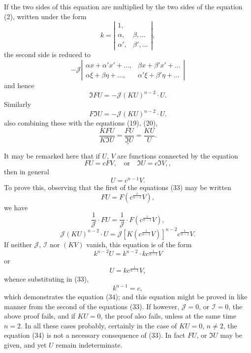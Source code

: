 \documentclass[11pt,a4paper]{book}
\begin{document}
\newpage
If the two sides of this equation are multiplied by the two sides of the equation
(2), written under the form
\[
k = \left|\begin{array}{cc}
1, & \\
\alpha, & \beta, \ldots \\
\alpha', & \beta', \ldots
\end{array}\right|
\tag{27},
\]
the second side is reduced to
\[
-\mathcal{J}
\left|\begin{array}{cc}
\alpha x + \alpha'x' + \ldots, & \beta x + \beta'x' + \ldots \\
\alpha\xi + \beta\eta + \ldots, & \alpha'\xi + \beta'\eta + \ldots
\end{array}\right|
\]
and hence
\[
\mathfrak{I}FU = -\mathcal{J}(KU)^{n-2}\cdot U
\tag{28}.
\]
Similarly
\[
F\mathfrak{I}U = -\mathcal{J}(KU)^{n-2}\cdot U
\tag{29}.
\]
also combining these with the equations (19), (20),
\[
\frac{KFU}{K\mathfrak{I}U} = \frac{FU}{\mathfrak{I}U} = \frac{KU}{U}
\tag{30}.
\]
\[
\tag{31}.
\]
\[
\tag{32}.
\]

It may be remarked here that if $U$, $V$ are functions connected by the equation
\[
FU = cFV, \quad \text{or} \quad \mathfrak{I}U = c\mathfrak{I}V, \tag{33},
\]
then in general
\[
U = c^{n-1}V \tag{34}.
\]
To prove this, observing that the first of the equations (33) may be written
\[
FU = F(c^{\frac{1}{n-1}}V) \tag{35},
\]
we have
\[
\frac{1}{\mathcal{J}} \cdot FU = \frac{1}{\mathcal{J}} \cdot F(c^{\frac{1}{n-1}}V) \tag{36},
\]
\[
\mathcal{J}(KU)^{n-2}\cdot U = \mathcal{J}[K(c^{\frac{1}{n-1}}V)]^{n-2} c^{\frac{1}{n-1}}V \tag{37}.
\]
If neither $\mathcal{J}$, $\mathcal{I}$ nor $(KV)$ vanish, this equation is of the form
\[
k^{n-2}U = k^{n-2}\cdot kc^{\frac{1}{n-1}}V
\]
or
\[
U = kc^{\frac{1}{n-1}}V \tag{38},
\]
whence substituting in (33),
\[
k^{n-1} = c \tag{39},
\]
which demonstrates the equation (34); and this equation might be proved in like
manner from the second of the equations (33). If however, $\mathcal{J} = 0$, or $\mathcal{I} = 0$, the above
proof fails, and if $KU = 0$, the proof also fails, unless at the same time $n = 2$. In all
these cases probably, certainly in the case of $KU = 0$, $n \neq 2$, the equation (34) is not
a necessary consequence of (33). In fact $FU$, or $\mathfrak{I}U$ may be given, and yet $U$
remain indeterminate.
\end{document}
